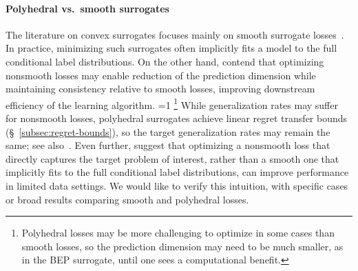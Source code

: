 \documentclass[twoside,11pt]{article}
\newcommand{\Comments}{1}
\newcommand{\CommentsR}{1}
\newcommand{\mynote}[2]{\ifnum\Comments=1\textcolor{#1}{#2}\fi}
\newcommand{\reviewerresponse}[2]{\ifnum\CommentsR=1%
  \todo[linecolor=#1!80!black,backgroundcolor=#1,bordercolor=#1!80!black]{#2}\fi}
\newcommand{\raf}[1]{\mynote{darkgreen}{[RF: #1]}}
\newcommand{\reviewertwo}[1]{\reviewerresponse{blue!20!white}{R2: #1}}
\begin{document}
\paragraph{Polyhedral vs.\ smooth surrogates}
The literature on convex surrogates focuses mainly on smooth surrogate losses~\citep{crammer2001algorithmic,bartlett2006convexity,bartlett2008classification, duchi2018multiclass, williamson2016composite, reid2010composite,menon2019multilabel,zhang2020convex,bao2020calibrated}.
In practice, minimizing such surrogates often implicitly fits a model to the full conditional label distributions.
On the other hand, \citet[Section 1.2]{ramaswamy2018consistent} contend that optimizing nonsmooth losses may enable reduction of the prediction dimension while maintaining consistency relative to smooth losses, improving downstream efficiency of the learning algorithm.%
\reviewertwo{B}
\footnote{Polyhedral losses may be more challenging to optimize in some cases than smooth losses, so the prediction dimension may need to be much smaller, as in the BEP surrogate, until one sees a computational benefit.}
While generalization rates may suffer for nonsmooth losses, polyhedral surrogates achieve linear regret transfer bounds (\S~\ref{subsec:regret-bounds}), so the target generalization rates may remain the same; see also~\citet{frongillo2021surrogate}.
Even further, \citet{lapin2016loss} suggest that optimizing a nonsmooth loss that directly captures the target problem of interest, rather than a smooth one that implicitly fits to the full conditional label distributions, can improve performance in limited data settings.
We would like to verify this intuition, with specific cases or broad results comparing smooth and polyhedral losses.
\end{document}
